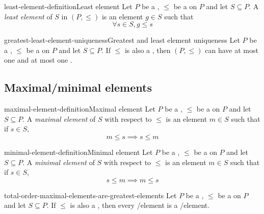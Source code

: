\documentclass[preview]{standalone}
\begin{document}
\begin{snippetdefinition}{least-element-definition}{Least element}
    Let \(P\) be a \set, \(\leq\) be a \preorder on \(P\) and let \(S\subseteq P\).
    A \textit{least element} of \(S\) in \((P, \leq)\) is an element \(g \in S\) such that
    \[ \forall s\in S, g \leq s \]
\end{snippetdefinition}


\begin{snippetcorollary}{greatest-least-element-uniqueness}{Greatest and least element uniqueness}
    Let \(P\) be a \set, \(\leq\) be a \preorder on \(P\) and let \(S\subseteq P\).
    If \(\leq\) is also a \partialorder, then \((P, \leq)\) can have at most one \greatestelement
    and at most one \leastelement.
\end{snippetcorollary}


\subsection{Maximal/minimal elements}

\begin{snippetdefinition}{maximal-element-definition}{Maximal element}
    Let \(P\) be a \set, \(\leq\) be a \preorder on \(P\) and let \(S\subseteq P\).
    A \emph{maximal element} of \(S\) with respect to \(\leq\) is an element \(m\in S\) such that
    if \(s\in S\),
    \[
        m \leq s \implies s \leq m
    \]
\end{snippetdefinition}


\begin{snippetdefinition}{minimal-element-definition}{Minimal element}
    Let \(P\) be a \set, \(\leq\) be a \preorder on \(P\) and let \(S\subseteq P\).
    A \emph{minimal element} of \(S\) with respect to \(\leq\) is an element \(m\in S\) such that
    if \(s\in S\),
    \[
        s \leq m \implies m \leq s
    \]
\end{snippetdefinition}


\begin{snippetproposition}{total-order-maximal-elements-are-greatest-elements}{}
    Let \(P\) be a \set, \(\leq\) be a \preorder on \(P\) and let \(S\subseteq P\).
    If \(\leq\) is also a \totalorder, then every \maximalelement[maximal]/\minimalelement[minimal] element
    is a \greatestelement[greatest]/\greatestelement[least] element.
\end{snippetproposition}
\end{document}
